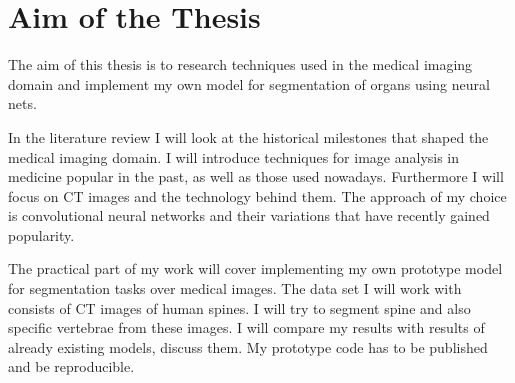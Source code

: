 \chapter{Aim of the Thesis}
\label{ch:aim}
The aim of this thesis is to research techniques used in the medical imaging domain and implement my own model for segmentation of organs using neural nets.

In the literature review I will look at the historical milestones that shaped the medical imaging domain. I will introduce techniques for image analysis in medicine popular in the past, as well as those used nowadays. Furthermore I will focus on CT images and the technology behind them. The approach of my choice is convolutional neural networks and their variations that have recently gained popularity. 

The practical part of my work will cover implementing my own prototype model for segmentation tasks over medical images. The data set I will work with consists of CT images of human spines. I will try to segment spine and also specific vertebrae from these images. I will compare my results with results of already existing models, discuss them. My prototype code has to be published and be reproducible. 